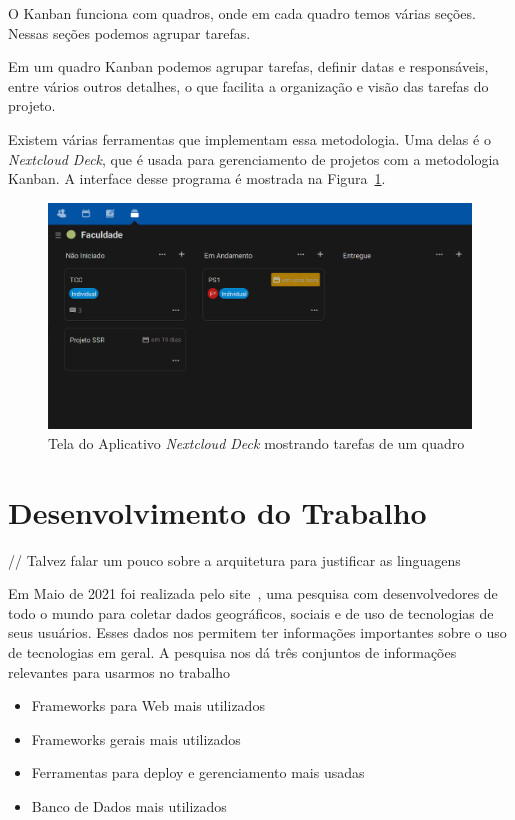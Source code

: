 \documentclass[12pt]{article}
\begin{document}
O Kanban funciona com quadros, onde em cada quadro temos várias seções.
Nessas seções podemos agrupar tarefas.

Em um quadro Kanban podemos agrupar tarefas, definir datas e responsáveis, entre vários outros
detalhes, o que facilita a organização e visão das tarefas do projeto.

Existem várias ferramentas que implementam essa metodologia.
Uma delas é o \emph{Nextcloud Deck}, que é usada para gerenciamento de projetos
com a metodologia Kanban. A interface desse programa é mostrada na Figura~\ref{fig:nexcloud-deck}.

\begin{figure}[H]
  \centering
  \includegraphics[width=.8\textwidth]{fig1.png}
  \caption{Tela do Aplicativo \emph{Nextcloud Deck} mostrando tarefas de um quadro}\label{fig:nexcloud-deck}
\end{figure}

\section{Desenvolvimento do Trabalho}

// Talvez falar um pouco sobre a arquitetura para justificar as linguagens

Em Maio de 2021 foi realizada pelo site~\cite{stack11}, uma pesquisa com desenvolvedores de todo o mundo para
coletar dados geográficos, sociais e de uso de tecnologias de seus usuários. Esses dados nos permitem ter
informações importantes sobre o uso de tecnologias em geral. A pesquisa nos dá três conjuntos
de informações relevantes para usarmos no trabalho

\begin{itemize}
  \item Frameworks para Web mais utilizados
  \item Frameworks gerais mais utilizados
  \item Ferramentas para deploy e gerenciamento mais usadas
  \item Banco de Dados mais utilizados
\end{itemize}
\end{document}

